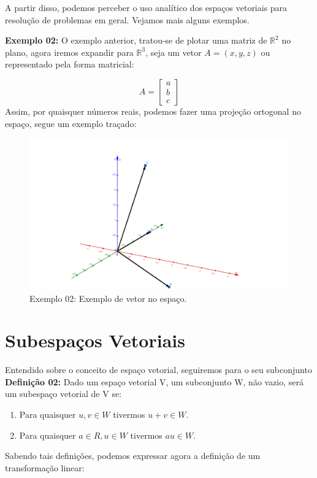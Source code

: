 A partir disso, podemos perceber o uso analítico dos espaços vetoriais para resolução de problemas em geral. Vejamos mais alguns exemplos.

\noindent\textbf{Exemplo 02:} O exemplo anterior, tratou-se de plotar uma matriz de $\mathbb{R}^2$ no plano, agora iremos expandir para $\mathbb{R}^3$, seja um vetor $A = (x, y, z)$ ou representado pela forma matricial:

\[
A = \begin{bmatrix}
	a \\ b \\ c
\end{bmatrix}
\]
\noindent Assim, por quaisquer números reais, podemos fazer uma projeção ortogonal no espaço, segue um exemplo traçado:

\begin{figure}[H]
	\centering
	\includegraphics[scale=0.30]{exemplo02.png}
	\caption{Exemplo 02: Exemplo de vetor no espaço.}
\end{figure}


\section{Subespaços Vetoriais}
Entendido sobre o conceito de espaço vetorial, seguiremos para o seu subconjunto
\noindent\textbf{Definição 02:} Dado um espaço vetorial V, um subconjunto W, não vazio, será um subespaço vetorial de V se:
\begin{enumerate}
	\item Para quaisquer $u, v \in W$ tivermos $u + v \in W$.
	\item Para quaisquer $a \in R, u \in W$ tivermos $au \in W$.
	\end{enumerate}


Sabendo tais definições, podemos expressar agora a definição de um transformação linear:



